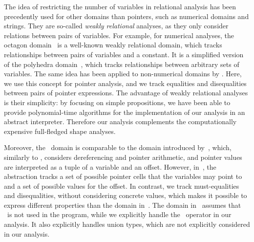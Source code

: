 The idea of restricting the number of variables in relational analysis has been precedently used
for other domains than pointers, such as numerical domains and strings.
They are so-called \emph{weakly relational} analyses, as they only consider relations between pairs of variables.
For example, for numerical analyses, the octagon domain~\cite{octagon} is a well-known weakly relational domain,
which tracks relationships between pairs of variables and a constant.
It is a simplified version of the polyhedra domain~\cite{polyhedra}, which tracks relationships between arbitrary sets of variables.
The same idea has been applied to non-numerical domains by \textcite{SeidlETS2023}.
Here, we use this concept for pointer analysis, and we track equalities and disequalities between pairs of pointer expressions.
The advantage of weakly relational analyses is their simplicity:
by focusing on simple propositions, we have been able to provide polynomial-time algorithms for the implementation of our analysis in an abstract interpreter.
Therefore our analysis complements the computationally expensive full-fledged shape analyses.

Moreover, the \cpo\ domain is comparable to the domain introduced by~\textcite{Mine06}, which, similarly to \cpo, considers dereferencing and pointer arithmetic, and pointer values are interpreted as a tuple of a variable and an offset.
However, in~\cite{Mine06}, the abstraction tracks
a set of possible pointer cells that the variables may point to and a set of possible values for the offset.
In contrast, we track must-equalities and disequalities, without considering concrete values,
which makes it possible to express different properties than the domain in~\cite{Mine06}.
The domain in~\cite{Mine06} assumes that \malloc\ is not used in the program,
while we explicitly handle the \malloc\ operator in our analysis.
It also explicitly handles union types, which are not explicitly considered in our analysis.

